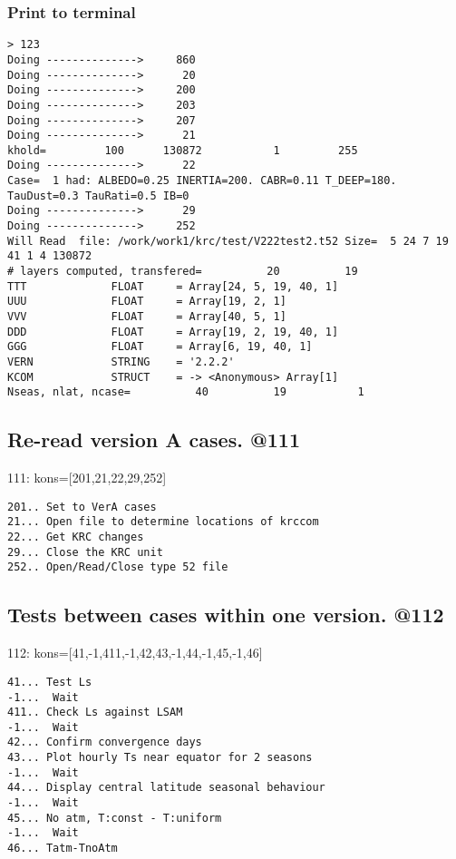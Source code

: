 \documentclass{article}  %
\begin{document}
\subsubsection{Print to terminal } %

\vspace{-3.mm} 
\begin{verbatim}
> 123
Doing -------------->     860
Doing -------------->      20
Doing -------------->     200
Doing -------------->     203
Doing -------------->     207
Doing -------------->      21
khold=         100      130872           1         255
Doing -------------->      22
Case=  1 had: ALBEDO=0.25 INERTIA=200. CABR=0.11 T_DEEP=180. TauDust=0.3 TauRati=0.5 IB=0 
Doing -------------->      29
Doing -------------->     252
Will Read  file: /work/work1/krc/test/V222test2.t52 Size=  5 24 7 19 41 1 4 130872
# layers computed, transfered=          20          19
TTT             FLOAT     = Array[24, 5, 19, 40, 1]
UUU             FLOAT     = Array[19, 2, 1]
VVV             FLOAT     = Array[40, 5, 1]
DDD             FLOAT     = Array[19, 2, 19, 40, 1]
GGG             FLOAT     = Array[6, 19, 40, 1]
VERN            STRING    = '2.2.2'
KCOM            STRUCT    = -> <Anonymous> Array[1]
Nseas, nlat, ncase=          40          19           1
\end{verbatim}


\subsection{Re-read version A cases. @111} %
111: kons=[201,21,22,29,252] 
\vspace{-3.mm} 
\begin{verbatim}
201.. Set to VerA cases
21... Open file to determine locations of krccom
22... Get KRC changes
29... Close the KRC unit
252.. Open/Read/Close type 52 file
\end{verbatim}

\subsection{Tests between cases within one version. @112} %

112: kons=[41,-1,411,-1,42,43,-1,44,-1,45,-1,46] 
\vspace{-3.mm} 
\begin{verbatim}
41... Test Ls
-1...  Wait
411.. Check Ls against LSAM
-1...  Wait
42... Confirm convergence days
43... Plot hourly Ts near equator for 2 seasons
-1...  Wait
44... Display central latitude seasonal behaviour
-1...  Wait
45... No atm, T:const - T:uniform
-1...  Wait
46... Tatm-TnoAtm
\end{verbatim}
\end{document}
